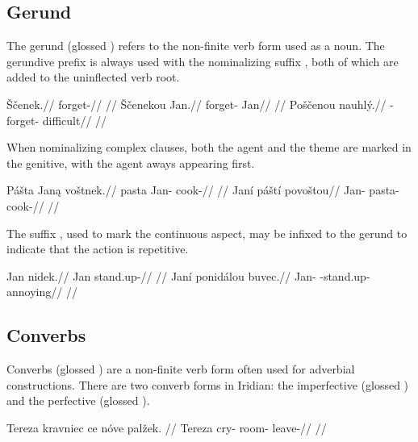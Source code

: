 \subsection{Gerund}
\par The gerund (glossed ) refers to the non-finite verb form used as a noun. The gerundive prefix  is always used with the nominalizing suffix , both of which are added to the uninflected verb root.

\pex
\a
\begingl
\gla \v{S}\v{c}enek.//
\glb forget-//
\glft {}//
\endgl
\a
\begingl
\gla \v{S}\v{c}enekou Jan.//
\glb forget- Jan//
\glft {}//
\endgl
\a
\begingl
\gla Po\v{s}\v{c}enou nauhl\'y.//
\glb {}-forget- difficult//
\glft {}//
\endgl
\xe

When nominalizing complex clauses, both the agent and the theme are marked in the genitive, with the agent aways appearing first.

\pex
\a
\begingl
\gla P\'a\v{s}ta Jan\k{a} vo\v{s}tnek.//
\glb pasta Jan- cook-//
\glft {}//
\endgl
\a
\begingl
\gla Jan\'i p\'a\v{s}t\'i povo\v{s}tou//
\glb Jan- pasta- cook-//
\glft {}//
\endgl
\xe

The suffix , used to mark the continuous aspect, may be infixed to the gerund to indicate that the action is repetitive.

\pex
\a
\begingl
\gla Jan nidek.//
\glb Jan stand.up-//
\glft {}//
\endgl
\a
\begingl
\gla Jan\'i ponid\'alou buvec.//
\glb Jan- -stand.up- annoying//
\glft {}//
\endgl
\xe

\subsection{Converbs}
Converbs (glossed ) are a non-finite verb form often used for adverbial constructions. There are two converb forms in Iridian: the imperfective  (glossed ) and the perfective  (glossed ).

\pex
\begingl
\gla Tereza kravniec ce nóve pal\v{z}ek. //
\glb Tereza cry-  room- leave-//
\glft {}//
\endgl
\xe

